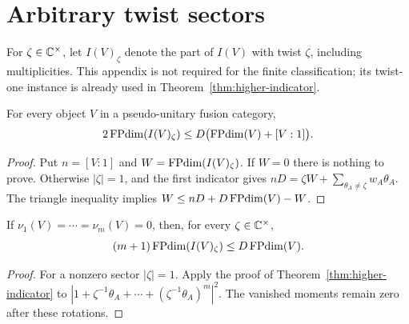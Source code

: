 \section{Arbitrary twist sectors}\label{sec:twist-sectors}
For $\zeta\in\mathbb C^\times$, let $I(V)_\zeta$ denote the part of $I(V)$ with
twist $\zeta$, including multiplicities. This appendix is not required
for the finite classification; its twist-one instance is already used
in Theorem~\ref{thm:higher-indicator}.

\begin{proposition}\label{prop:twist-sector}
For every object $V$ in a pseudo-unitary fusion category,
\[
 2\operatorname{FPdim}(I(V)_\zeta)\leq D\bigl(\operatorname{FPdim}(V)+[V:1]\bigr).
\]
\end{proposition}
\begin{proof}
Put $n=[V:1]$ and $W=\operatorname{FPdim}(I(V)_\zeta)$. If $W=0$ there is nothing to
prove. Otherwise $|\zeta|=1$, and the first indicator gives
$nD=\zeta W+\sum_{\theta_A\ne\zeta}w_A\theta_A$. The triangle inequality
implies $W\leq nD+D\operatorname{FPdim}(V)-W$.
\end{proof}

\begin{corollary}\label{cor:higher-sector}
If $\nu_1(V)=\cdots=\nu_m(V)=0$, then, for every $\zeta\in\mathbb C^\times$,
\[
 (m+1)\operatorname{FPdim}(I(V)_\zeta)\leq D\operatorname{FPdim}(V).
\]
\end{corollary}
\begin{proof}
For a nonzero sector $|\zeta|=1$. Apply the proof of
Theorem~\ref{thm:higher-indicator} to
$|1+\zeta^{-1}\theta_A+\cdots+(\zeta^{-1}\theta_A)^m|^2$.
The vanished moments remain zero after these rotations.
\end{proof}
